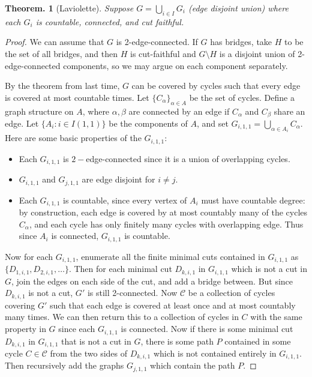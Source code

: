 \documentclass[11pt, a4paper]{memoir}
\theoremstyle{change}
\newtheorem{theorem}{Theorem.}[section]
\theoremstyle{plain}
\theoremstyle{nonumberplain}
\newtheorem{proof}{Proof}
\numberwithin{equation}{section}
\begin{document}
\begin{theorem}[Laviolette]
    Suppose $G=\bigcup_{i\in I}G_i$ (edge disjoint union) where each $G_i$ is countable, connected, and cut faithful.
\end{theorem}
\begin{proof}
    We can assume that $G$ is 2-edge-connected.
    If $G$ has bridges, take $H$ to be the set of all bridges, and then $H$ is cut-faithful and $G\setminus H$ is a disjoint union of 2-edge-connected components, so we may argue on each component separately.

    By the theorem from last time, $G$ can be covered by cycles such that every edge is covered at most countable times.
    Let $\{C_\alpha\}_{\alpha\in A}$ be the set of cycles.
    Define a graph structure on $A$, where $\alpha,\beta$ are connected by an edge if $C_\alpha$ and $C_\beta$ share an edge.
    Let $\{A_i:i\in I(1,1)\}$ be the components of $A$, and set $G_{i,1,1}=\bigcup_{\alpha\in A_i}C_\alpha$.
    Here are some basic properties of the $G_{i,1,1}$:
    \begin{itemize}[nl]
        \item Each $G_{i,1,1}$ is $2-$edge-connected since it is a union of overlapping cycles.
        \item $G_{i,1,1}$ and $G_{j,1,1}$ are edge disjoint for $i\neq j$.
        \item Each $G_{i,1,1}$ is countable, since every vertex of $A_i$ must have countable degree: by construction, each edge is covered by at most countably many of the cycles $C_\alpha$, and each cycle has only finitely many cycles with overlapping edge.
            Thus since $A_i$ is connected, $G_{i,1,1}$ is countable.
    \end{itemize}

    Now for each $G_{i,1,1}$, enumerate all the finite minimal cuts contained in $G_{i,1,1}$ as $\{D_{1,i,1},D_{2,i,1},\ldots\}$.
    Then for each minimal cut $D_{k,i,1}$ in $G_{i,1,1}$ which is not a cut in $G$, join the edges on each side of the cut, and add a bridge between.
    But since $D_{k,i,1}$ is not a cut, $G'$ is still 2-connected.
    Now $\mathcal{C}$ be a collection of cycles covering $G'$ such that each edge is covered at least once and at most countably many times.
    We can then return this to a collection of cycles in $C$ with the same property in $G$ since each $G_{i,1,1}$ is connected.
    Now if there is some minimal cut $D_{k,i,1}$ in $G_{i,1,1}$ that is not a cut in $G$, there is some path $P$ contained in some cycle $C\in\mathcal{C}$ from the two sides of $D_{k,i,1}$ which is not contained entirely in $G_{i,1,1}$.
    Then recursively add the graphs $G_{j,1,1}$ which contain the path $P$.


\end{proof}
\end{document}
